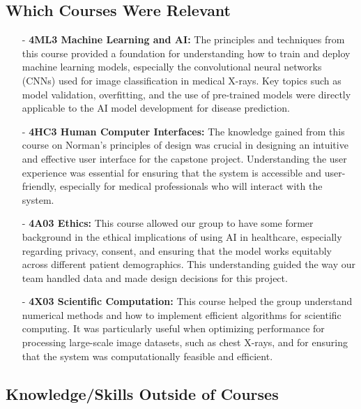 \documentclass{article}
\begin{document}
\subsection{Which Courses Were Relevant}

\begin{itemize}
    \item[-] \textbf{4ML3 Machine Learning and AI:} The principles and techniques from this course provided a foundation for understanding how to train and deploy machine learning models, especially the convolutional neural networks (CNNs) used for image classification in medical X-rays. Key topics such as model validation, overfitting, and the use of pre-trained models were directly applicable to the AI model development for disease prediction.
    
    \item[-] \textbf{4HC3 Human Computer Interfaces:} The knowledge gained from this course on Norman's principles of design was crucial in designing an intuitive and effective user interface for the capstone project. Understanding the user experience was essential for ensuring that the system is accessible and user-friendly, especially for medical professionals who will interact with the system.
    
    \item[-] \textbf{4A03 Ethics:} This course allowed our group to have some former background in the ethical implications of using AI in healthcare, especially regarding privacy, consent, and ensuring that the model works equitably across different patient demographics. This understanding guided the way our team handled data and made design decisions for this project.
    
    \item[-] \textbf{4X03 Scientific Computation:} This course helped the group understand numerical methods and how to implement efficient algorithms for scientific computing. It was particularly useful when optimizing performance for processing large-scale image datasets, such as chest X-rays, and for ensuring that the system was computationally feasible and efficient.

\end{itemize}

\subsection{Knowledge/Skills Outside of Courses}
\end{document}
